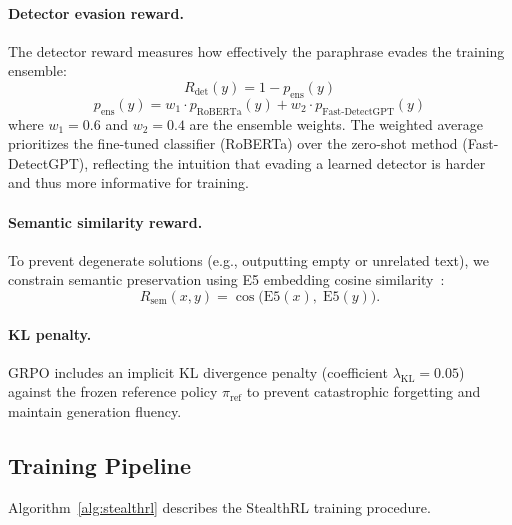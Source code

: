 \documentclass[11pt]{article}
\begin{document}
\paragraph{Detector evasion reward.} The detector reward measures how effectively the paraphrase evades the training ensemble:
\begin{equation}
  R_{\text{det}}(y) = 1 - p_{\text{ens}}(y)
\end{equation}
\begin{equation}
  p_{\text{ens}}(y) = w_1 \cdot p_{\text{RoBERTa}}(y) + w_2 \cdot p_{\text{Fast-DetectGPT}}(y)
\end{equation}
where $w_1 = 0.6$ and $w_2 = 0.4$ are the ensemble weights. The weighted average prioritizes the fine-tuned classifier (RoBERTa) over the zero-shot method (Fast-DetectGPT), reflecting the intuition that evading a learned detector is harder and thus more informative for training.

\paragraph{Semantic similarity reward.} To prevent degenerate solutions (e.g., outputting empty or unrelated text), we constrain semantic preservation using E5 embedding cosine similarity~\cite{wang2022e5}:
\begin{equation}
  R_{\text{sem}}(x, y) = \cos\bigl(\text{E5}(x),\; \text{E5}(y)\bigr).
\end{equation}

\paragraph{KL penalty.} GRPO includes an implicit KL divergence penalty (coefficient $\lambda_{\text{KL}} = 0.05$) against the frozen reference policy $\pi_{\text{ref}}$ to prevent catastrophic forgetting and maintain generation fluency.

\subsection{Training Pipeline}
\label{sec:training}

Algorithm~\ref{alg:stealthrl} describes the StealthRL training procedure.
\end{document}
